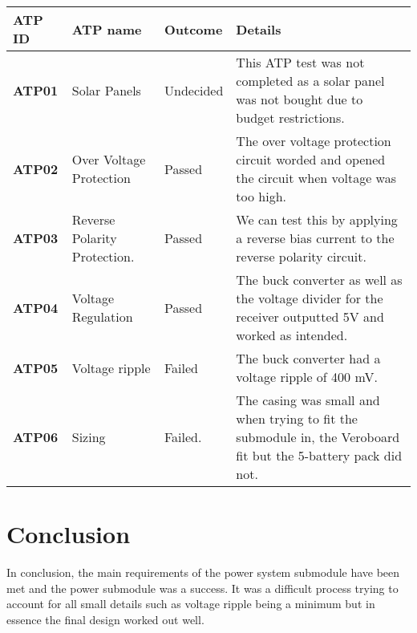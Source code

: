 \documentclass[class=report,11pt,crop=false]{standalone}
\begin{document}
\begin{table}
\centering

\begin{tabular}{| l | l | l | l |}
\hline
\textbf{ATP ID} & \textbf{ATP name} & \textbf{Outcome} & \textbf{Details} \\
\hline
\textbf{ATP01} & Solar Panels & Undecided

  & This ATP test was not completed as a solar panel was not bought due to budget restrictions. \\
\hline
\textbf{ATP02} & Over Voltage Protection & Passed & The over voltage protection circuit worded and opened the circuit when voltage was too high. \\
\hline
\textbf{ATP03} & Reverse Polarity Protection. & Passed & We can test this by applying a reverse bias current to the reverse polarity circuit. \\
\hline
\textbf{ATP04} & Voltage Regulation & Passed  & The buck converter as well as the voltage divider for the receiver outputted 5V and worked as intended. \\
\hline
\textbf{ATP05} & Voltage ripple & Failed & The buck converter had a voltage ripple of 400 mV. \\
\hline
\textbf{ATP06} & Sizing & Failed. & The casing was small and when trying to fit the submodule in, the Veroboard fit but the 5-battery pack did not. \\
\hline

\end{tabular}

\end{table}

 

\section{Conclusion}

In conclusion, the main requirements of the power system submodule have been met and the power submodule was a success. It was a difficult process trying to account for all small details such as voltage ripple being a minimum but in essence the final design worked out well.

\ifstandalone

\printnoidxglossary[type=\acronymtype,nonumberlist]
\fi
\end{document}
